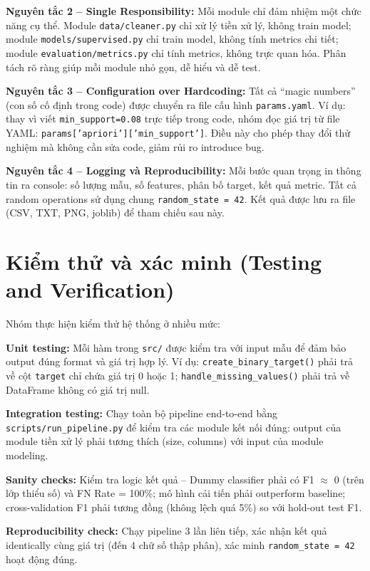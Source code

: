 \textbf{Nguyên tắc 2 -- Single Responsibility:} Mỗi module chỉ đảm nhiệm một chức năng cụ thể. Module \texttt{data/cleaner.py} chỉ xử lý tiền xử lý, không train model; module \texttt{models/supervised.py} chỉ train model, không tính metrics chi tiết; module \texttt{evaluation/metrics.py} chỉ tính metrics, không trực quan hóa. Phân tách rõ ràng giúp mỗi module nhỏ gọn, dễ hiểu và dễ test.

\textbf{Nguyên tắc 3 -- Configuration over Hardcoding:} Tất cả ``magic numbers'' (con số cố định trong code) được chuyển ra file cấu hình \texttt{params.yaml}. Ví dụ: thay vì viết \texttt{min\_support=0.08} trực tiếp trong code, nhóm đọc giá trị từ file YAML: \texttt{params['apriori']['min\_support']}. Điều này cho phép thay đổi thử nghiệm mà không cần sửa code, giảm rủi ro introduce bug.

\textbf{Nguyên tắc 4 -- Logging và Reproducibility:} Mỗi bước quan trọng in thông tin ra console: số lượng mẫu, số features, phân bố target, kết quả metric. Tất cả random operations sử dụng chung \texttt{random\_state = 42}. Kết quả được lưu ra file (CSV, TXT, PNG, joblib) để tham chiếu sau này.

\section{Kiểm thử và xác minh (Testing and Verification)}

Nhóm thực hiện kiểm thử hệ thống ở nhiều mức:

\textbf{Unit testing:} Mỗi hàm trong \texttt{src/} được kiểm tra với input mẫu để đảm bảo output đúng format và giá trị hợp lý. Ví dụ: \texttt{create\_binary\_target()} phải trả về cột \texttt{target} chỉ chứa giá trị 0 hoặc 1; \texttt{handle\_missing\_values()} phải trả về DataFrame không có giá trị null.

\textbf{Integration testing:} Chạy toàn bộ pipeline end-to-end bằng \texttt{scripts/run\_pipeline.py} để kiểm tra các module kết nối đúng: output của module tiền xử lý phải tương thích (size, columns) với input của module modeling.

\textbf{Sanity checks:} Kiểm tra logic kết quả -- Dummy classifier phải có F1 $\approx$ 0 (trên lớp thiểu số) và FN Rate = 100\%; mô hình cải tiến phải outperform baseline; cross-validation F1 phải tương đồng (không lệch quá 5\%) so với hold-out test F1.

\textbf{Reproducibility check:} Chạy pipeline 3 lần liên tiếp, xác nhận kết quả identically cùng giá trị (đến 4 chữ số thập phân), xác minh \texttt{random\_state = 42} hoạt động đúng.
